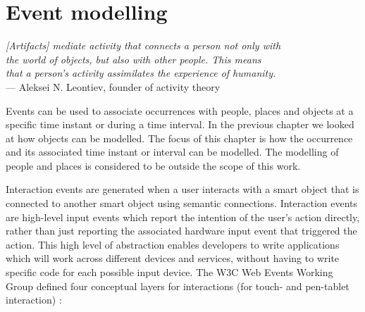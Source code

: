 \chapter{Event modelling}
\label{EventModelling}

\begin{flushright}{\slshape    
[Artifacts] mediate activity that connects a person not only with \\
 the world of objects, but also with other people. This means \\
that a person's activity assimilates the experience of humanity.} \\ \medskip
    ---  Aleksei N. Leontiev, founder of activity theory
\end{flushright}


Events can be used to associate occurrences with people, places and objects at a specific time instant or during a time interval. In the previous chapter we looked at how objects can be modelled. The focus of this chapter is how the occurrence and its associated time instant or interval can be modelled. The modelling of people and places is considered to be outside the scope of this work.


Interaction events are generated when a user interacts with a smart object that is connected to another smart object using semantic connections. Interaction events are high-level input events which report the intention of the user's action directly, rather than just reporting the associated hardware input event that triggered the action. This high level of abstraction enables developers to write applications which will work across different devices and services, without having to write specific code for each possible input device. The W3C Web Events Working Group defined four conceptual layers for interactions (for touch- and pen-tablet interaction) \cite{w3cevents}:

